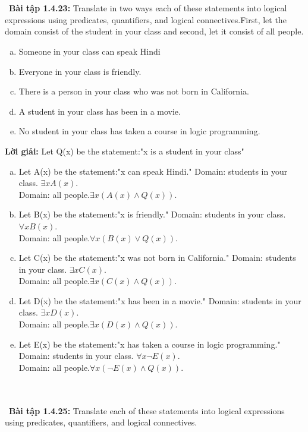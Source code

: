 \documentclass[a4paper]{article}
\begin{document}
 \\\ \\\
\textbf{Bài tập 1.4.23: } Translate in two ways each of these statements  into logical expressions using predicates, quantifiers, and logical connectives.First, let the domain consist of the student in your class and second, let it consist of all people.
\begin{enumerate}[a)]
\item Someone in your class can speak Hindi
\item Everyone in your class is friendly.
\item There is a person in your class who was not born in California.
\item A student in your class has been in a movie.
\item No student in your class has taken a course in logic programming.
\end{enumerate}
\textbf{Lời giải:} Let Q(x) be the statement:"x is a student in your class"\\
\begin{enumerate}[a)]
\item Let A(x) be the statement:"x can speak Hindi."
Domain: students in your class. $\exists x A(x)$.\\
Domain: all people.$\exists x (A(x) \land Q(x))$.
\item Let B(x) be the statement:"x is friendly."
Domain: students in your class. $\forall x B(x)$.\\
Domain: all people.$\forall x (B(x) \lor Q(x))$.
\item Let C(x) be the statement:"x was not born in California."
Domain: students in your class. $\exists x C(x)$.\\
Domain: all people.$\exists x (C(x) \land Q(x))$.
\item Let D(x) be the statement:"x has been in a movie."
Domain: students in your class. $\exists x D(x)$.\\
Domain: all people.$\exists x (D(x) \land Q(x))$.
\item Let E(x) be the statement:"x has taken a course in logic programming."
Domain: students in your class. $\forall x \lnot E(x)$.\\
Domain: all people.$\forall x (\lnot E(x) \land Q(x))$.
\end{enumerate} \\\ \\\
\textbf{Bài tập 1.4.25: }  Translate each of these statements into logical expressions  using predicates, quantifiers, and logical connectives.
\end{document}
